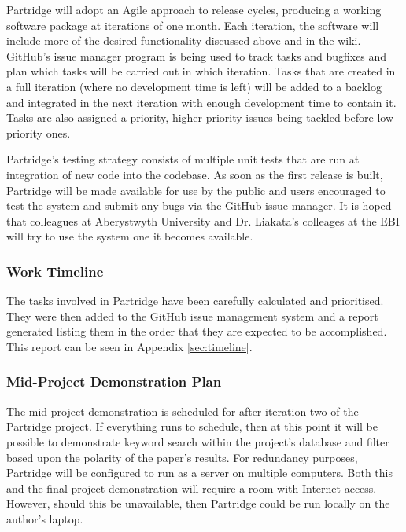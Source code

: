 \documentclass[12pt,a4paper]{article}
\begin{document}
Partridge will adopt an Agile approach to release cycles, producing a working
software package at iterations of one month.  Each iteration, the software will
include more of the desired functionality discussed above and in the wiki.
GitHub's issue manager program is being used to track tasks and bugfixes and
plan which tasks will be carried out in which iteration. Tasks that are created
in a full iteration (where no development time is left) will be added to a
backlog and integrated in the next iteration with enough development time to
contain it. Tasks are also assigned a priority, higher priority issues being
tackled before low priority ones.

Partridge's testing strategy consists of multiple unit tests that are run at
integration of new code into the codebase. As soon as the first release is
built, Partridge will be made available for use by the public and users
encouraged to test the system and submit any bugs via the GitHub issue manager.
It is hoped that colleagues at Aberystwyth University and Dr. Liakata's
colleages at the EBI will try to use the system one it becomes available.

\subsubsection{ Work Timeline }

The tasks involved in Partridge have been carefully calculated and prioritised.
They were then added to the GitHub issue management system and a report
generated listing them in the order that they are expected to be
accomplished. This report can be seen in Appendix \ref{sec:timeline}. 


\subsubsection{ Mid-Project Demonstration Plan}

The mid-project demonstration is scheduled for after iteration two of the
Partridge project. If everything runs to schedule, then at this point it will
be possible to demonstrate keyword search within the project's database and
filter based upon the polarity of the paper's results. For redundancy purposes,
Partridge will be configured to run as a server on multiple computers. Both
this and the final project demonstration will require a room with Internet
access. However, should this be unavailable, then Partridge could be run
locally on the author's laptop.
\end{document}
